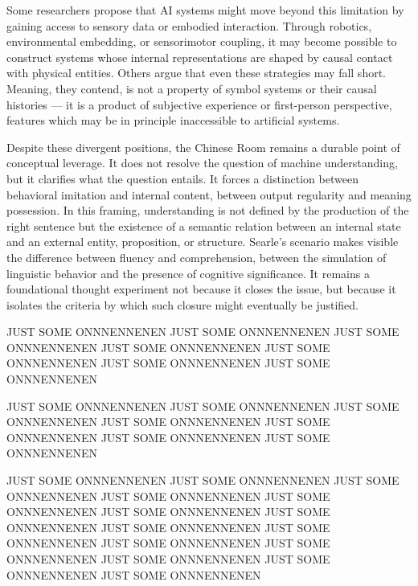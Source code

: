 Some researchers propose that AI systems might move beyond this limitation by gaining access to sensory data or embodied interaction. Through robotics, environmental embedding, or sensorimotor coupling, it may become possible to construct systems whose internal representations are shaped by causal contact with physical entities. Others argue that even these strategies may fall short. Meaning, they contend, is not a property of symbol systems or their causal histories — it is a product of subjective experience or first-person perspective, features which may be in principle inaccessible to artificial systems.

Despite these divergent positions, the Chinese Room remains a durable point of conceptual leverage. It does not resolve the question of machine understanding, but it clarifies what the question entails. It forces a distinction between behavioral imitation and internal content, between output regularity and meaning possession. In this framing, understanding is not defined by the production of the right sentence but the existence of a semantic relation between an internal state and an external entity, proposition, or structure. Searle’s scenario makes visible the difference between fluency and comprehension, between the simulation of linguistic behavior and the presence of cognitive significance. It remains a foundational thought experiment not because it closes the issue, but because it isolates the criteria by which such closure might eventually be justified.

JUST SOME ONNNENNENEN
JUST SOME ONNNENNENEN
JUST SOME ONNNENNENEN
JUST SOME ONNNENNENEN
JUST SOME ONNNENNENEN
JUST SOME ONNNENNENEN
JUST SOME ONNNENNENEN

JUST SOME ONNNENNENEN
JUST SOME ONNNENNENEN
JUST SOME ONNNENNENEN
JUST SOME ONNNENNENEN
JUST SOME ONNNENNENEN
JUST SOME ONNNENNENEN
JUST SOME ONNNENNENEN

JUST SOME ONNNENNENEN
JUST SOME ONNNENNENEN
JUST SOME ONNNENNENEN
JUST SOME ONNNENNENEN
JUST SOME ONNNENNENEN
JUST SOME ONNNENNENEN
JUST SOME ONNNENNENEN
JUST SOME ONNNENNENEN
JUST SOME ONNNENNENEN
JUST SOME ONNNENNENEN
JUST SOME ONNNENNENEN
JUST SOME ONNNENNENEN
JUST SOME ONNNENNENEN
JUST SOME ONNNENNENEN